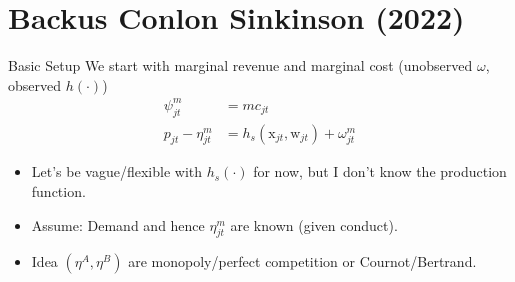 \documentclass[aspectratio=169,10pt]{beamer}
\begin{document}









\section{Backus Conlon Sinkinson (2022)}




\begin{frame}{Basic Setup}
We start with marginal revenue and marginal cost (unobserved $\omega$, observed $h(\cdot)$)
\begin{align*}
\psi_{jt}^{m} &= mc_{jt} \\
p_{jt} -\eta_{jt}^m &= h_s(\textrm{x}_{jt},\textrm{w}_{jt})  + \omega_{jt}^m
\end{align*}
\begin{itemize}
\item Let's be vague/flexible with $h_s(\cdot)$ for now, but I don't know the production function.
\item Assume: Demand and hence $\eta_{jt}^{m}$ are \alert{known (given conduct)}.\\
\item Idea $(\eta^{A},\eta^{B})$ are monopoly/perfect competition or Cournot/Bertrand.
\end{itemize}
\end{frame}
\end{document}
